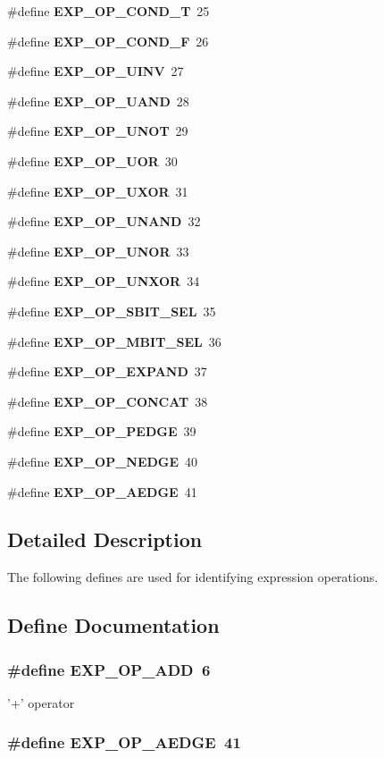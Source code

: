 \begin{CompactItemize}
\#define {\bf EXP\_\-OP\_\-COND\_\-T}\ 25
\item 
\#define {\bf EXP\_\-OP\_\-COND\_\-F}\ 26
\item 
\#define {\bf EXP\_\-OP\_\-UINV}\ 27
\item 
\#define {\bf EXP\_\-OP\_\-UAND}\ 28
\item 
\#define {\bf EXP\_\-OP\_\-UNOT}\ 29
\item 
\#define {\bf EXP\_\-OP\_\-UOR}\ 30
\item 
\#define {\bf EXP\_\-OP\_\-UXOR}\ 31
\item 
\#define {\bf EXP\_\-OP\_\-UNAND}\ 32
\item 
\#define {\bf EXP\_\-OP\_\-UNOR}\ 33
\item 
\#define {\bf EXP\_\-OP\_\-UNXOR}\ 34
\item 
\#define {\bf EXP\_\-OP\_\-SBIT\_\-SEL}\ 35
\item 
\#define {\bf EXP\_\-OP\_\-MBIT\_\-SEL}\ 36
\item 
\#define {\bf EXP\_\-OP\_\-EXPAND}\ 37
\item 
\#define {\bf EXP\_\-OP\_\-CONCAT}\ 38
\item 
\#define {\bf EXP\_\-OP\_\-PEDGE}\ 39
\item 
\#define {\bf EXP\_\-OP\_\-NEDGE}\ 40
\item 
\#define {\bf EXP\_\-OP\_\-AEDGE}\ 41
\end{CompactItemize}


\subsection{Detailed Description}
The following defines are used for identifying expression operations. 

\subsection{Define Documentation}
\subsubsection{\setlength{\rightskip}{0pt plus 5cm}\#define EXP\_\-OP\_\-ADD\ 6}\label{group__expr__ops_a6}


'+' operator 
\subsubsection{\setlength{\rightskip}{0pt plus 5cm}\#define EXP\_\-OP\_\-AEDGE\ 41}\label{group__expr__ops_a41}


